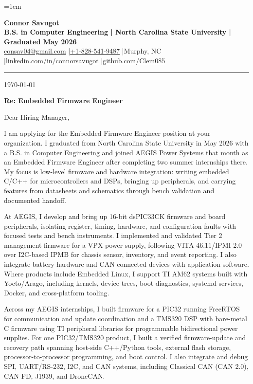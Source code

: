 \documentclass[10pt,letterpaper]{article}
\newcommand{\TargetRole}{Embedded Firmware Engineer}
\newcommand{\TargetCompany}{your organization}
\begin{document}
\fontsize{10.35}{12.65}\selectfont
\RaggedRight
\setlength{\RaggedRightRightskip}{0pt plus 5em}
\emergencystretch=1em

\begin{center}
  {\fontsize{22}{23}\selectfont\bfseries Connor Savugot}\\[2pt]
  {\bfseries B.S. in Computer Engineering | North Carolina State University | Graduated May 2026}\\[2pt]
  {\fontsize{9.7}{10.5}\selectfont
    \href{mailto:consav04@gmail.com}{consav04@gmail.com}
    \enspace|\enspace \href{tel:+18285419487}{+1-828-541-9487}
    \enspace|\enspace Murphy, NC
    \enspace|\enspace \href{https://linkedin.com/in/connorsavugot}{linkedin.com/in/connorsavugot}
    \enspace|\enspace \href{https://github.com/Clem085}{github.com/Clem085}}
\end{center}

\vspace{-0.15em}
\hrule
\vspace{0.8em}

\today

\textbf{Re: \TargetRole}

Dear Hiring Manager,

I am applying for the \TargetRole{} position at \TargetCompany. I graduated from North Carolina State University in May 2026 with a B.S. in Computer Engineering and joined AEGIS Power Systems that month as an Embedded Firmware Engineer after completing two summer internships there. My focus is low-level firmware and hardware integration: writing embedded C/C++ for microcontrollers and DSPs, bringing up peripherals, and carrying features from datasheets and schematics through bench validation and documented handoff.

At AEGIS, I develop and bring up 16-bit dsPIC33CK firmware and board peripherals, isolating register, timing, hardware, and configuration faults with focused tests and bench instruments. I implemented and validated Tier 2 management firmware for a VPX power supply, following VITA 46.11/IPMI 2.0 over I2C-based IPMB for chassis sensor, inventory, and event reporting. I also integrate battery hardware and CAN-connected devices with application software. Where products include Embedded Linux, I support TI AM62 systems built with Yocto/Arago, including kernels, device trees, boot diagnostics, systemd services, Docker, and cross-platform tooling.

Across my AEGIS internships, I built firmware for a PIC32 running FreeRTOS for communication and update coordination and a TMS320 DSP with bare-metal C firmware using TI peripheral libraries for programmable bidirectional power supplies. For one PIC32/TMS320 product, I built a verified firmware-update and recovery path spanning host-side C++/Python tools, external flash storage, processor-to-processor programming, and boot control. I also integrate and debug SPI, UART/RS-232, I2C, and CAN systems, including Classical CAN (CAN 2.0), CAN FD, J1939, and DroneCAN.
\end{document}
